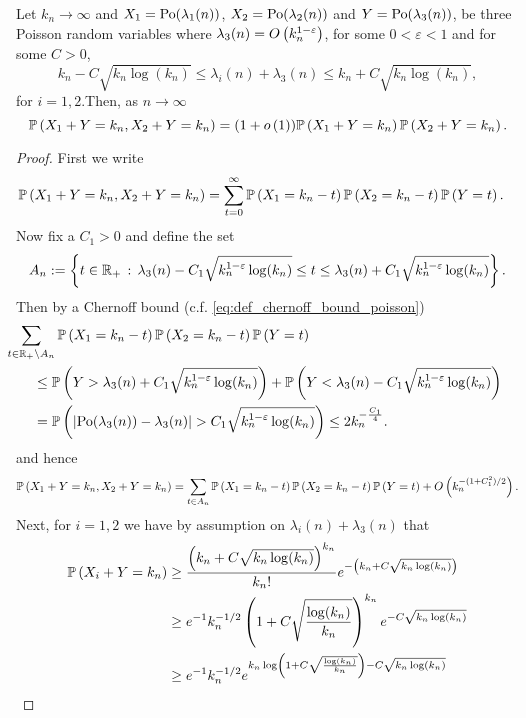 \begin{lemma}\label{lem:near_independence_poisson}
Let $k_n \to \infty$ and $X_1 = {\mathrm{Po}}(\lambda_1(n))$, $X_2 = {\mathrm{Po}}(\lambda_2(n))$ and $Y = {\mathrm{Po}}(\lambda_3(n))$, be three Poisson random variables where $\lambda_3(n) = O\left(k_n^{1-\varepsilon}\right)$, for some $0 < \varepsilon < 1$ and for some $C > 0$,
\[
	k_n - C\sqrt{k_n \log(k_n)} \le \lambda_i(n) + \lambda_3(n) \le k_n + C\sqrt{k_n \log(k_n)},
\] 
for $i = 1,2$.Then, as $n \to \infty$
\[
	\mathbb{P}\left(X_1 + Y = k_n, X_2 + Y = k_n\right) = (1+o\left(1\right)) \mathbb{P}\left(X_1 + Y = k_n\right)\mathbb{P}\left(X_2 + Y = k_n\right).
\]
\end{lemma}

\begin{proof}
First we write
\begin{align*}
	\mathbb{P}\left(X_1 + Y = k_n, X_2 + Y = k_n\right) 
	&= \sum_{t = 0}^\infty \mathbb{P}\left(X_1 = k_n - t\right)\mathbb{P}\left(X_2 = k_n - t\right)\mathbb{P}\left(Y = t\right).
\end{align*}
Now fix a $C_1 > 0$ and define the set
\[
	A_n := \left\{t \in {\ensuremath{\mathbb R}}_+ \, : \, \lambda_3(n) - C_1\sqrt{k_n^{1-\varepsilon}\log(k_n)} \le t 
	\le \lambda_3(n) + C_1\sqrt{k_n^{1-\varepsilon}\log(k_n)} \right\}.
\]
Then by a Chernoff bound (c.f. \eqref{eq:def_chernoff_bound_poisson})
\begin{align*}
	&\hspace{-20pt}\sum_{t \in \R_+ \setminus A_n} \Prob{X_1 = k_n - t}\Prob{X_2 = k_n - t}\Prob{Y = t}\\
	&\le \Prob{Y > \lambda_3(n) + C_1\sqrt{k_n^{1-\varepsilon}\log(k_n)}} 
		+ \Prob{Y < \lambda_3(n) - C_1\sqrt{k_n^{1-\varepsilon}\log(k_n)}}\\
	&= \Prob{\left|\Po(\lambda_3(n)) - \lambda_3(n)\right| > C_1\sqrt{k_n^{1-\varepsilon}\log(k_n)}} 
		\le 2 k_n^{-\frac{C_1}{4}}.
\end{align*}
and hence
\[
	\mathbb{P}\left(X_1 + Y = k_n, X_2 + Y = k_n\right) 
	= \sum_{t \in A_n} \mathbb{P}\left(X_1 = k_n - t\right)\mathbb{P}\left(X_2 = k_n - t\right)\mathbb{P}\left(Y = t\right) + O\left(k_n^{-(1+C_1^2)/2}\right).
\]
Next, for $i=1,2$ we have by assumption on $\lambda_i(n) + \lambda_3(n)$ that
\begin{align*}
	\Prob{X_i + Y = k_n} &\ge \frac{\left(k_n + C\sqrt{k_n \log(k_n)}\right)^{k_n}}{k_n!} 
		e^{-\left(k_n + C\sqrt{k_n \log(k_n)}\right)}\\
	&\ge e^{-1} k_n^{-1/2} \left(1 + C\sqrt{\frac{\log(k_n)}{k_n}}\right)^{k_n} e^{-C\sqrt{k_n \log(k_n)}}\\
	&\ge e^{-1} k_n^{-1/2} e^{k_n \log\left(1 + C\sqrt{\frac{\log(k_n)}{k_n}}\right) -C\sqrt{k_n \log(k_n)}}\\

\end{align*}
\end{proof}
